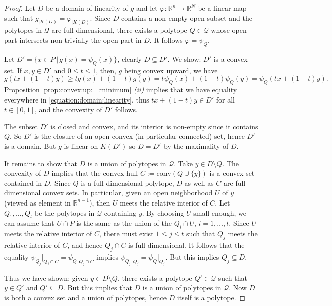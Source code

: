 \documentclass[12pt, a4article]{amsart}   	%
\numberwithin{equation}{section}
\theoremstyle{plain}
\theoremstyle{definition}
\newcommand{\R}{{\mathbb R}}
\newcommand{\mcQ}{{\mathcal Q}}
\begin{document}
\begin{proof} Let $D$ be a domain of linearity of $g$ and let $\varphi:\R^n\longrightarrow \R^N$ be a linear map such that $g_{|K(D)} = \varphi_{|K(D)}$. Since $D$ contains a non-empty open subset and the polytopes in $\mathcal Q$ are full dimensional, there exists a polytope $Q\in\mathcal Q$ whose open part intersects non-trivially the open part in $D$. It follows $\varphi = \psi_Q$.

Let $D'= \{ x\in P\,|\, g(x) = \psi_Q(x)\}$, clearly $D\subseteq D'$. We show: $D'$ is a convex set. 
If $x,y\in D'$ and $0\leq t\leq 1$, then, $g$ being convex upward, we have
\begin{equation}\label{equation:domain:linearity}
g(t {x}+(1-t) {y})\geq t g( {x})+(1-t)g( {y})=t\psi_Q( {x})+(1-t)\psi_Q( {y})=\psi_Q(t {x}+(1-t) {y}).
\end{equation}
Proposition \ref{prop:convex:up:=:minimum} \textit{(ii)} implies that we have equality everywhere in \eqref{equation:domain:linearity}, 
thus $tx + (1-t)y\in D'$ for all $t\in[0,1]$, and the convexity of $D'$ follows.

The subset $D'$ is closed and convex, and its interior is non-empty since it contains $Q$.
So $D'$ is the closure of an open convex (in particular connected) set, hence $D'$ is a domain. 
But $g$ is linear on $K(D')$ so $D= D'$ by the maximality of $D$.

It remains to show that $D$ is a union of polytopes in $\mathcal Q$.  Take $ {y}\in D\setminus Q$.
The convexity of $D$ implies that the convex hull $C:=\mathrm{conv}(Q\cup\{y\})$ is a convex set contained in $D$.
Since $Q$ is a full dimensional polytope, $D$ as well as $C$ are full dimensional convex sets. In particular,
given an open neighborhood $U$ of $ {y}$ (viewed as element in $\mathbb R^{n-1}$), then $U$ meets the relative interior of $C$.
Let $Q_1,\ldots,Q_t$ be the polytopes in $\mathcal Q$ containing $ {y}$. By choosing $U$ small enough, we can assume that $U\cap P$
is the same as the union of the $Q_i\cap U$, $i=1,\ldots,t$. Since $U$ meets the relative interior of $C$, there must exist $1\le j\le t$ such that 
$Q_j$ meets the relative interior of $C$, and hence $Q_j\cap C$ is full dimensional. It follows that the equality
$\psi_{Q_j}\vert_{Q_j\cap C}=\psi_{Q}\vert_{Q_j\cap C}$ implies $\psi_{Q_j}\vert_{Q_j}=\psi_{Q}\vert_{Q_j}$. But this implies $Q_j\subseteq D$.

Thus we have shown: given $ {y}\in D\setminus Q$, there exists a polytope $Q'\in\mathcal Q$ such that $ {y}\in Q'$ and 
$Q'\subseteq D$. But this implies that $D$ is a union of polytopes in $\mcQ$.
Now $D$ is both a convex set and a union of polytopes, hence $D$ itself is a polytope.
\end{proof}
\end{document}
